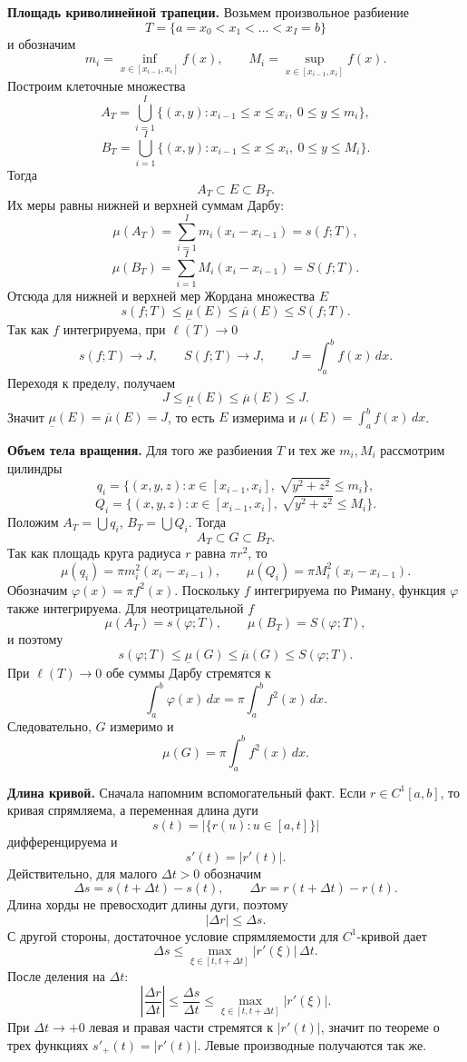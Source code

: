 \documentclass[12pt,a4paper]{article}
\newcommand{\dd}{\,d}
\begin{document}
\textbf{Площадь криволинейной трапеции.}
Возьмем произвольное разбиение
\[
  T=\{a=x_0<x_1<\dots<x_I=b\}
\]
и обозначим
\[
  m_i=\inf_{x\in[x_{i-1},x_i]} f(x),
  \qquad
  M_i=\sup_{x\in[x_{i-1},x_i]} f(x).
\]
Построим клеточные множества
\[
  A_T=\bigcup_{i=1}^I
  \{(x,y):x_{i-1}\le x\le x_i,\ 0\le y\le m_i\},
\]
\[
  B_T=\bigcup_{i=1}^I
  \{(x,y):x_{i-1}\le x\le x_i,\ 0\le y\le M_i\}.
\]
Тогда
\[
  A_T\subset E\subset B_T.
\]
Их меры равны нижней и верхней суммам Дарбу:
\[
  \mu(A_T)=\sum_{i=1}^I m_i(x_i-x_{i-1})=s(f;T),
\]
\[
  \mu(B_T)=\sum_{i=1}^I M_i(x_i-x_{i-1})=S(f;T).
\]
Отсюда для нижней и верхней мер Жордана множества \(E\)
\[
  s(f;T)\le \underline\mu(E)\le \overline\mu(E)\le S(f;T).
\]
Так как \(f\) интегрируема, при \(\ell(T)\to0\)
\[
  s(f;T)\to J,\qquad S(f;T)\to J,
  \qquad J=\int_a^b f(x)\dd x.
\]
Переходя к пределу, получаем
\[
  J\le \underline\mu(E)\le \overline\mu(E)\le J.
\]
Значит \(\underline\mu(E)=\overline\mu(E)=J\), то есть \(E\) измерима и
\(\mu(E)=\int_a^b f(x)\dd x\).

\textbf{Объем тела вращения.}
Для того же разбиения \(T\) и тех же \(m_i,M_i\) рассмотрим цилиндры
\[
  q_i=\{(x,y,z):x\in[x_{i-1},x_i],\ \sqrt{y^2+z^2}\le m_i\},
\]
\[
  Q_i=\{(x,y,z):x\in[x_{i-1},x_i],\ \sqrt{y^2+z^2}\le M_i\}.
\]
Положим \(A_T=\bigcup q_i\), \(B_T=\bigcup Q_i\). Тогда
\[
  A_T\subset G\subset B_T.
\]
Так как площадь круга радиуса \(r\) равна \(\pi r^2\), то
\[
  \mu(q_i)=\pi m_i^2(x_i-x_{i-1}),
  \qquad
  \mu(Q_i)=\pi M_i^2(x_i-x_{i-1}).
\]
Обозначим \(\varphi(x)=\pi f^2(x)\). Поскольку \(f\) интегрируема по Риману,
функция \(\varphi\) также интегрируема. Для неотрицательной \(f\)
\[
  \mu(A_T)=s(\varphi;T),\qquad \mu(B_T)=S(\varphi;T),
\]
и поэтому
\[
  s(\varphi;T)\le
  \underline\mu(G)\le \overline\mu(G)\le S(\varphi;T).
\]
При \(\ell(T)\to0\) обе суммы Дарбу стремятся к
\[
  \int_a^b \varphi(x)\dd x=\pi\int_a^b f^2(x)\dd x.
\]
Следовательно, \(G\) измеримо и
\[
  \mu(G)=\pi\int_a^b f^2(x)\dd x.
\]

\textbf{Длина кривой.}
Сначала напомним вспомогательный факт. Если \(r\in C^1[a,b]\), то кривая
спрямляема, а переменная длина дуги
\[
  s(t)=|\{r(u):u\in[a,t]\}|
\]
дифференцируема и
\[
  s'(t)=|r'(t)|.
\]
Действительно, для малого \(\Delta t>0\) обозначим
\[
  \Delta s=s(t+\Delta t)-s(t),\qquad
  \Delta r=r(t+\Delta t)-r(t).
\]
Длина хорды не превосходит длины дуги, поэтому
\[
  |\Delta r|\le \Delta s.
\]
С другой стороны, достаточное условие спрямляемости для \(C^1\)-кривой дает
\[
  \Delta s
  \le
  \max_{\xi\in[t,t+\Delta t]} |r'(\xi)|\,\Delta t.
\]
После деления на \(\Delta t\):
\[
  \left|\frac{\Delta r}{\Delta t}\right|
  \le
  \frac{\Delta s}{\Delta t}
  \le
  \max_{\xi\in[t,t+\Delta t]} |r'(\xi)|.
\]
При \(\Delta t\to+0\) левая и правая части стремятся к \(|r'(t)|\), значит
по теореме о трех функциях \(s'_+(t)=|r'(t)|\). Левые производные
получаются так же.
\end{document}
